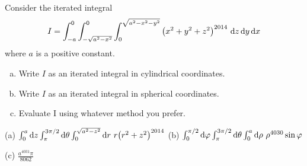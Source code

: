 \begin{question}[M200 2014D] %
Consider the iterated integral
\begin{equation*}
I =\int_{-a}^0\int_{-\sqrt{a^2-x^2}}^0 \int_0^{\sqrt{a^2-x^2-y^2}}
    \big(x^2+y^2+z^2\big)^{2014}\ \mathrm{d}z\,\mathrm{d}y\,\mathrm{d}x
\end{equation*}
where $a$ is a positive constant.
\begin{enumerate}[(a)]
\item
Write $I$ as an iterated integral in cylindrical coordinates.
\item
Write $I$ as an iterated integral in spherical coordinates.
\item
Evaluate I using whatever method you prefer.
\end{enumerate}
\end{question}

%

\begin{answer}
(a) $\int_0^a \mathrm{d}z\int_{\pi}^{3\pi/2}\mathrm{d}\theta 
      \int_0^{\sqrt{a^2-z^2}}\mathrm{d}r\ r\big(r^2+z^2\big)^{2014}$\qquad
(b) $\int_0^{\pi/2} \mathrm{d}\varphi\int_{\pi}^{3\pi/2}\mathrm{d}\theta 
     \int_0^a\mathrm{d}\rho\ \rho^{4030}\sin\varphi$

(c) $\frac{a^{4031}\pi}{8062}$
\end{answer}

